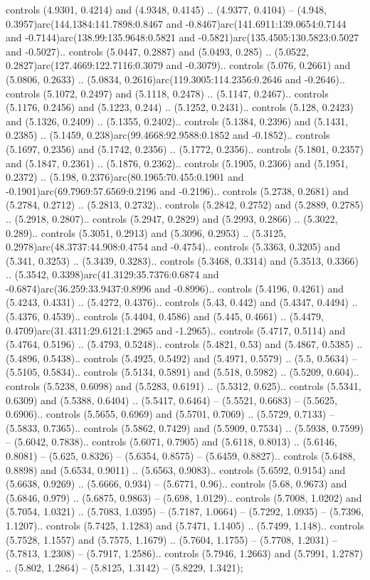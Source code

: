 controls (4.9301, 0.4214) and (4.9348, 0.4145) .. (4.9377, 0.4104) -- (4.948, 0.3957)arc(144.1384:141.7898:0.8467 and -0.8467)arc(141.6911:139.0654:0.7144 and -0.7144)arc(138.99:135.9648:0.5821 and -0.5821)arc(135.4505:130.5823:0.5027 and -0.5027).. controls (5.0447, 0.2887) and (5.0493, 0.285) .. (5.0522, 0.2827)arc(127.4669:122.7116:0.3079 and -0.3079).. controls (5.076, 0.2661) and (5.0806, 0.2633) .. (5.0834, 0.2616)arc(119.3005:114.2356:0.2646 and -0.2646).. controls (5.1072, 0.2497) and (5.1118, 0.2478) .. (5.1147, 0.2467).. controls (5.1176, 0.2456) and (5.1223, 0.244) .. (5.1252, 0.2431).. controls (5.128, 0.2423) and (5.1326, 0.2409) .. (5.1355, 0.2402).. controls (5.1384, 0.2396) and (5.1431, 0.2385) .. (5.1459, 0.238)arc(99.4668:92.9588:0.1852 and -0.1852).. controls (5.1697, 0.2356) and (5.1742, 0.2356) .. (5.1772, 0.2356).. controls (5.1801, 0.2357) and (5.1847, 0.2361) .. (5.1876, 0.2362).. controls (5.1905, 0.2366) and (5.1951, 0.2372) .. (5.198, 0.2376)arc(80.1965:70.455:0.1901 and -0.1901)arc(69.7969:57.6569:0.2196 and -0.2196).. controls (5.2738, 0.2681) and (5.2784, 0.2712) .. (5.2813, 0.2732).. controls (5.2842, 0.2752) and (5.2889, 0.2785) .. (5.2918, 0.2807).. controls (5.2947, 0.2829) and (5.2993, 0.2866) .. (5.3022, 0.289).. controls (5.3051, 0.2913) and (5.3096, 0.2953) .. (5.3125, 0.2978)arc(48.3737:44.908:0.4754 and -0.4754).. controls (5.3363, 0.3205) and (5.341, 0.3253) .. (5.3439, 0.3283).. controls (5.3468, 0.3314) and (5.3513, 0.3366) .. (5.3542, 0.3398)arc(41.3129:35.7376:0.6874 and -0.6874)arc(36.259:33.9437:0.8996 and -0.8996).. controls (5.4196, 0.4261) and (5.4243, 0.4331) .. (5.4272, 0.4376).. controls (5.43, 0.442) and (5.4347, 0.4494) .. (5.4376, 0.4539).. controls (5.4404, 0.4586) and (5.445, 0.4661) .. (5.4479, 0.4709)arc(31.4311:29.6121:1.2965 and -1.2965).. controls (5.4717, 0.5114) and (5.4764, 0.5196) .. (5.4793, 0.5248).. controls (5.4821, 0.53) and (5.4867, 0.5385) .. (5.4896, 0.5438).. controls (5.4925, 0.5492) and (5.4971, 0.5579) .. (5.5, 0.5634) -- (5.5105, 0.5834).. controls (5.5134, 0.5891) and (5.518, 0.5982) .. (5.5209, 0.604).. controls (5.5238, 0.6098) and (5.5283, 0.6191) .. (5.5312, 0.625).. controls (5.5341, 0.6309) and (5.5388, 0.6404) .. (5.5417, 0.6464) -- (5.5521, 0.6683) -- (5.5625, 0.6906).. controls (5.5655, 0.6969) and (5.5701, 0.7069) .. (5.5729, 0.7133) -- (5.5833, 0.7365).. controls (5.5862, 0.7429) and (5.5909, 0.7534) .. (5.5938, 0.7599) -- (5.6042, 0.7838).. controls (5.6071, 0.7905) and (5.6118, 0.8013) .. (5.6146, 0.8081) -- (5.625, 0.8326) -- (5.6354, 0.8575) -- (5.6459, 0.8827).. controls (5.6488, 0.8898) and (5.6534, 0.9011) .. (5.6563, 0.9083).. controls (5.6592, 0.9154) and (5.6638, 0.9269) .. (5.6666, 0.934) -- (5.6771, 0.96).. controls (5.68, 0.9673) and (5.6846, 0.979) .. (5.6875, 0.9863) -- (5.698, 1.0129).. controls (5.7008, 1.0202) and (5.7054, 1.0321) .. (5.7083, 1.0395) -- (5.7187, 1.0664) -- (5.7292, 1.0935) -- (5.7396, 1.1207).. controls (5.7425, 1.1283) and (5.7471, 1.1405) .. (5.7499, 1.148).. controls (5.7528, 1.1557) and (5.7575, 1.1679) .. (5.7604, 1.1755) -- (5.7708, 1.2031) -- (5.7813, 1.2308) -- (5.7917, 1.2586).. controls (5.7946, 1.2663) and (5.7991, 1.2787) .. (5.802, 1.2864) -- (5.8125, 1.3142) -- (5.8229, 1.3421);



